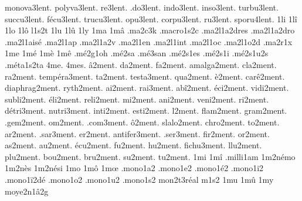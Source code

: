 {monova3lent.
polyva3lent.
    re3lent.
   .do3lent.
  indo3lent.
  inso3lent.
 turbu3lent.
 succu3lent.
  fécu3lent.
 trucu3lent.
   opu3lent.
 corpu3lent.
    ru3lent.
 sporu4lent.
%
1li
1lî
1lo
1lô
l1s2t
1lu
1lû
1ly
1ma
1mâ
                    .ma2c3k
                    .macro1s2c
                    .ma2l1a2dres
                    .ma2l1a2dro
                    .ma2l1aisé
                    .ma2l1ap
                    .ma2l1a2v
                    .ma2l1en
                    .ma2l1int
                    .ma2l1oc
                    .ma2l1o2d
                    .ma2r1x %
1me
1mé
1mè
1mê
                    .mé2g1oh
                    .mé2sa %
                    .mé3san %
                    .mé2s1es
                    .mé2s1i
                    .mé2s1u2s
                    .méta1s2ta
4me.
4mes.
       â2ment.
       da2ment.
       fa2ment.
   amalga2ment.
      cla2ment.
       ra2ment.
  tempéra3ment.
       ta2ment.
    testa3ment.
      qua2ment.
        è2ment.
     carê2ment.
 diaphrag2ment.
     ryth2ment.
       ai2ment.
      rai3ment.
      abî2ment.
      éci2ment.
     vidi2ment.
    subli2ment.
      éli2ment.
     reli2ment.
       mi2ment.
      ani2ment.
     veni2ment.
       ri2ment.
    détri3ment.
    nutri3ment.
     inti2ment.
     esti2ment.
        l2ment.
     flam2ment.
     gram2ment.
     .gem2ment.
       om2ment.
     .com3ment.
        ô2ment.
    slalo2ment.
     chro2ment.
       to2ment.
       ar2ment.
     .sar3ment.
       er2ment.
  antifer3ment.
     .ser3ment.
      fir2ment.
       or2ment.
       as2ment.
       au2ment.
      écu2ment.
       fu2ment.
       hu2ment.
    fichu3ment.
      llu2ment.
      plu2ment.
      bou2ment.
      bru2ment.
       su2ment.
       tu2ment.
%
1mi
1mî
                    .milli1am
                    1m2némo
                    1m2nès
                    1m2nési
1mo
1mô
1mœ
                    .mono1a2
                    .mono1e2
                    .mono1é2
                    .mono1i2
                    .mono1ï2dé
                    .mono1o2
                    .mono1u2
                    .mono1s2
                    mon2t3réal %
m1s2
1mu
1mû
1my
                    moye2n1â2g
}
